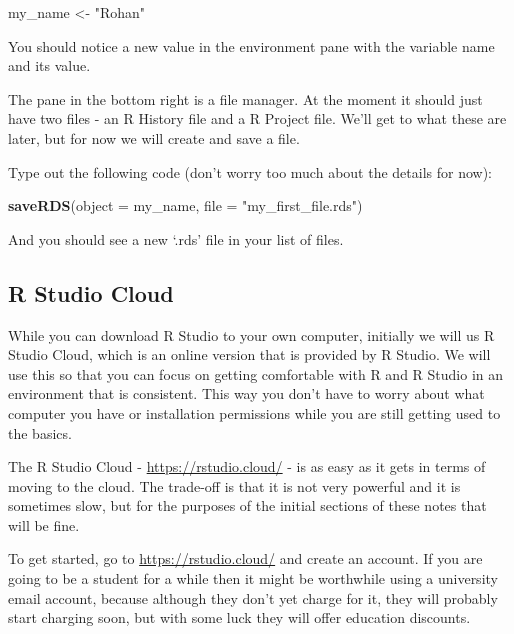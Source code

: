 \documentclass[
]{book}
\newenvironment{Shaded}{\begin{snugshade}}{\end{snugshade}}
\newcommand{\DataTypeTok}[1]{\textcolor[rgb]{0.13,0.29,0.53}{#1}}
\newcommand{\KeywordTok}[1]{\textcolor[rgb]{0.13,0.29,0.53}{\textbf{#1}}}
\newcommand{\NormalTok}[1]{#1}
\newcommand{\StringTok}[1]{\textcolor[rgb]{0.31,0.60,0.02}{#1}}
\begin{document}
\begin{Shaded}
\begin{Highlighting}[]
\NormalTok{my_name <-}\StringTok{ "Rohan"}
\end{Highlighting}
\end{Shaded}

You should notice a new value in the environment pane with the variable name and its value.

The pane in the bottom right is a file manager. At the moment it should just have two files - an R History file and a R Project file. We'll get to what these are later, but for now we will create and save a file.

Type out the following code (don't worry too much about the details for now):

\begin{Shaded}
\begin{Highlighting}[]
\KeywordTok{saveRDS}\NormalTok{(}\DataTypeTok{object =}\NormalTok{ my_name, }\DataTypeTok{file =} \StringTok{"my_first_file.rds"}\NormalTok{)}
\end{Highlighting}
\end{Shaded}

And you should see a new `.rds' file in your list of files.

\hypertarget{r-studio-cloud}{%
\subsection{R Studio Cloud}\label{r-studio-cloud}}

While you can download R Studio to your own computer, initially we will us R Studio Cloud, which is an online version that is provided by R Studio. We will use this so that you can focus on getting comfortable with R and R Studio in an environment that is consistent. This way you don't have to worry about what computer you have or installation permissions while you are still getting used to the basics.

The R Studio Cloud - \url{https://rstudio.cloud/} - is as easy as it gets in terms of moving to the cloud. The trade-off is that it is not very powerful and it is sometimes slow, but for the purposes of the initial sections of these notes that will be fine.

To get started, go to \url{https://rstudio.cloud/} and create an account. If you are going to be a student for a while then it might be worthwhile using a university email account, because although they don't yet charge for it, they will probably start charging soon, but with some luck they will offer education discounts.
\end{document}

